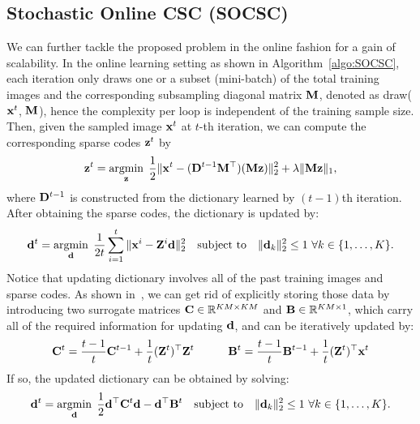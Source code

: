 \subsection{Stochastic Online CSC (SOCSC)}
We can further tackle the proposed problem in the online fashion for a gain of scalability. In the online learning setting as shown in Algorithm~\ref{algo:SOCSC}, each iteration only draws one or a subset (mini-batch) of the total training images and the corresponding subsampling diagonal matrix $\mask$, denoted as draw($\signal^t$, $\mask$), hence the complexity per loop is independent of the training sample size. Then, given the sampled image $\signal^t$ at $t$-th iteration, we can compute the corresponding sparse codes $\code^t$ by
\begin{equation} \label{eq:updatingCodeOnline}
    \code^t = \minimize{\code} \frac{1}{2}\|\signal^t - (\Filter^{t-1} \mask^\top)(\mask \code) \|_2^2 + \lambda \|\mask \code\|_1,
\end{equation}
where $\Filter^{t-1}$ is constructed from the dictionary learned by $(t-1)$th iteration. After obtaining the sparse codes, the dictionary is updated by:
\begin{equation}
    \filter^t = \minimize{\filter} \frac{1}{2t}\sum_{i=1}^{t} \|\signal^i - \Code^i \filter \|_2^2 \quad \text{subject to} \quad \|\filter_k\|^2_2 \leq 1 ~ \forall k \in \{1,\dots,K\}.
\end{equation}
Notice that updating dictionary involves all of the past training images and sparse codes. As shown in~\cite{mairal2009online,mairal2010online}, we can get rid of explicitly storing those data by introducing two surrogate matrices $\surC \in \mathbb{R}^{KM \times KM}$ and $\surB \in \mathbb{R}^{KM \times 1}$, which carry all of the required information for updating $\filter$, and can be iteratively updated by:
\begin{equation} \label{eq:updateSur}
    \surC^t  = \frac{t-1}{t} \surC^{t-1} + \frac{1}{t}(\Code^t)^\top \Code^t ~~~~~~~~~ \surB^t  = \frac{t-1}{t} \surB^{t-1} + \frac{1}{t}(\Code^t)^\top \signal^t
\end{equation}
If so, the updated dictionary can be obtained by solving:
\begin{equation} \label{eq:updatingFilterOnline}
    \filter^t = \minimize{\filter} \frac{1}{2} \filter^\top \surC^t\filter - \filter^\top \surB^t \quad \text{subject to} \quad \|\filter_k\|_2^2 \leq 1 ~ \forall k \in \{1,\dots,K\}.
\end{equation}

